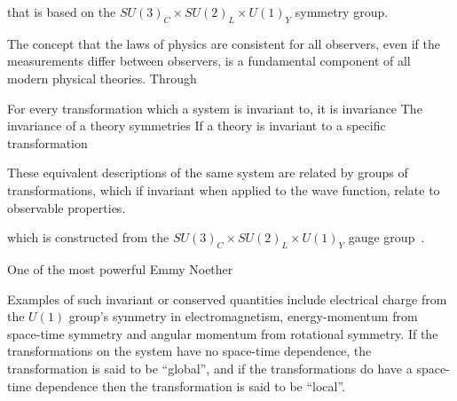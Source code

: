 that is based on the $SU(3)_{C} \times SU(2)_{L} \times U(1)_{Y}$ symmetry group.

%
%
%
%
%
%
%
%

The concept that the laws of physics are consistent for all observers, even if the measurements differ between observers, is a fundamental component of all modern physical theories. 
Through  

For every transformation which a system is invariant to, it is 
invariance 
The invariance of a theory  symmetries 
If a theory is invariant to a specific transformation 


These equivalent descriptions of the same system are related by groups of transformations, which if invariant when applied to the wave function, relate to observable properties\cite{QFT}. 



which is constructed from the $SU(3)_{C} \times SU(2)_{L} \times U(1)_{Y}$ gauge group~\cite{LagrangiansSM}.


One of the most powerful Emmy Noether

Examples of such invariant or conserved quantities include electrical charge from the $U(1)$ group’s symmetry in electromagnetism, energy-momentum from space-time symmetry and angular momentum from rotational symmetry\cite{Haywood}. 
If the transformations on the system have no space-time dependence, the transformation is said to be ``global'', and if the transformations do have a space-time dependence then the transformation is said to be ``local''. 


